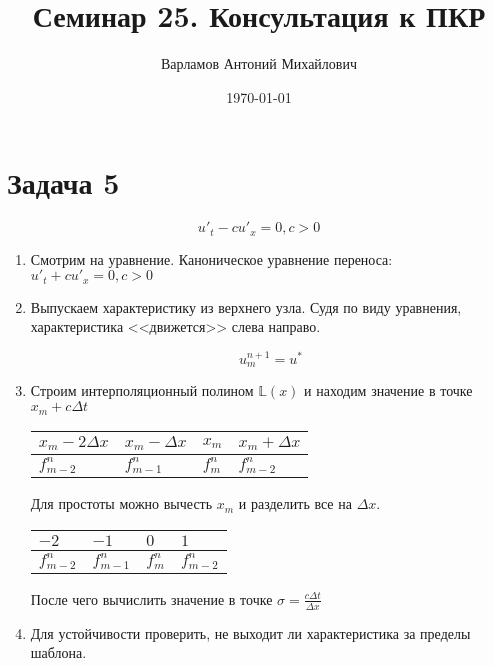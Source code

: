 \documentclass[10pt,a4paper]{article}
\title{Семинар 25. Консультация к ПКР}
\date{\today}
\author{Варламов Антоний Михайлович}
\begin{document}
	\maketitle
	
	\section{Задача 5}
	
	\begin{equation}
		u'_{t} - cu'_{x} = 0, c > 0
	\end{equation}
	
	\begin{enumerate}
		\item Смотрим на уравнение. Каноническое уравнение переноса: $u'_{t} + 
		cu'_{x} = 0, c > 0$
		
		\item Выпускаем характеристику из верхнего узла. Судя по виду уравнения,
		характеристика <<движется>> слева направо.
		
		\begin{equation}
			u_{m}^{n + 1} = u^{*}
		\end{equation}
		
		\item Строим интерполяционный полином $\mathbb{L}\left(x\right)$ и
		находим значение в точке $x_{m} + c\Delta t$
		
	\begin{center}
\begin{tabular}{|l|l|l|l|}
\hline
$x_{m} - 2\Delta x$ & $x_{m} - \Delta x$ & $x_{m} $    & $x_{m} + \Delta x$ \\ \hline
$f^{n}_{m - 2}$     & $f^{n}_{m - 1}$    & $f^{n}_{m}$ & $f^{n}_{m - 2}$    \\ \hline
\end{tabular} 
\end{center}

		Для простоты можно вычесть $x_{m}$ и разделить все на $\Delta x$.

		\begin{center}
\begin{tabular}{|l|l|l|l|}
\hline
$-2$ & $-1$ & $0 $    & $1$ \\ \hline
$f^{n}_{m - 2}$     & $f^{n}_{m - 1}$    & $f^{n}_{m}$ & $f^{n}_{m - 2}$    \\ \hline
\end{tabular} 
\end{center}		
		
		После чего вычислить значение в точке $\sigma = \frac{c\Delta t}
		{\Delta x}$
		
		\item Для устойчивости проверить, не выходит ли характеристика за пределы шаблона.
	\end{enumerate}
	
\end{document}
